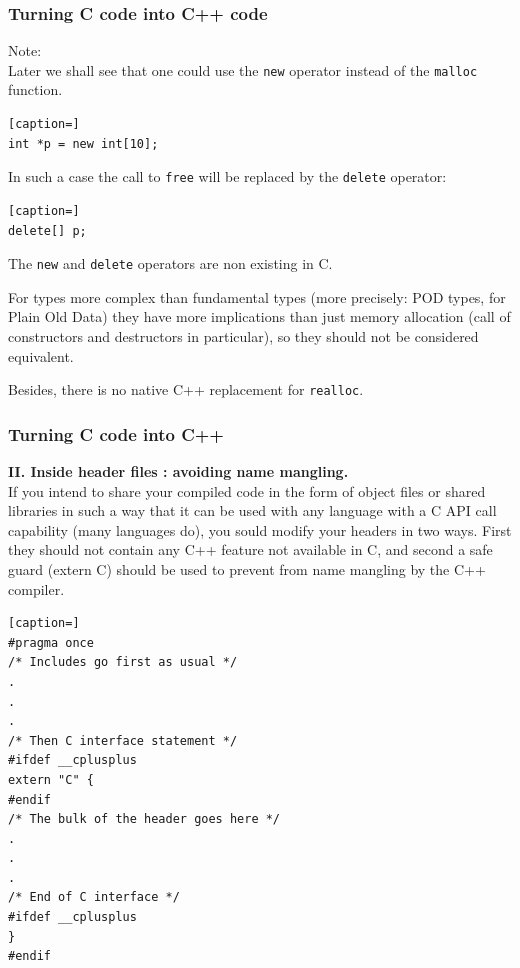 \documentclass[8pt]{beamer}
\begin{document}
\begin{frame}[containsverbatim]
\frametitle{Turning C code into C++ code}
Note:\\
Later we shall see that one could use the {\tt new} operator instead of the {\tt malloc} function.

\medskip

\begin{lstlisting}[caption=]
int *p = new int[10];
\end{lstlisting}

\medskip

In such a case the call to {\tt free} will be replaced by the {\tt delete}
operator:

\medskip

\begin{lstlisting}[caption=]
delete[] p;
\end{lstlisting}

\medskip

The {\tt new} and {\tt delete} operators are non existing in C.

\medskip

For types more complex than fundamental types (more precisely: POD types, for Plain
Old Data) they have more implications than just memory allocation (call of 
constructors and destructors in particular), so they should not be considered 
equivalent. 

\medskip

Besides, there is no native C++ replacement
for {\tt realloc}.
\end{frame}

\begin{frame}[containsverbatim]
\frametitle{Turning C code into C++}
{\bf II. Inside header files : avoiding name mangling.} \\[3pt]

If you intend to share your compiled code in the form of object files or shared libraries
in such a way that it can be used with any language with a C API call
capability (many languages do), you sould modify your headers in two 
ways. First they should not contain any 
C++ feature not available in C, and second a safe guard (extern C) 
should be used to prevent from name mangling by the C++ compiler. 

\begin{lstlisting}[caption=]
#pragma once
/* Includes go first as usual */
.
.
.
/* Then C interface statement */
#ifdef __cplusplus
extern "C" {
#endif
/* The bulk of the header goes here */
.
.
.
/* End of C interface */
#ifdef __cplusplus
}
#endif
\end{lstlisting}
\end{frame}
\end{document}
